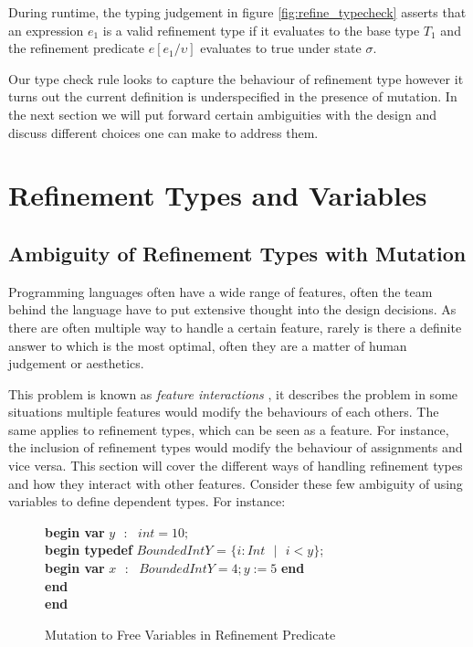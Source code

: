 \documentclass[a4paper,12pt]{report}
\newenvironment{tabs}[1]
 {\flushleft\TabPositions{#1}}
 {\endflushleft}
\begin{document}
\par
During runtime, the typing judgement in figure \ref{fig:refine_typecheck} 
asserts that an expression $e_1$ is a valid refinement type if it 
evaluates to the base type $T_1$ and the refinement predicate $e[e_1/\upsilon]$ 
evaluates to true under state $\sigma$.

\par
Our type check rule looks to capture the behaviour of refinement type however it 
turns out the current definition is underspecified in the presence of mutation. 
In the next section we will put forward certain ambiguities with the 
design and discuss different choices one can make to address them.

\section{Refinement Types and Variables}
\subsection{Ambiguity of Refinement Types with Mutation}
Programming languages often have a wide range of features, often the team behind 
the language have to put extensive thought into the design decisions. As there 
are often multiple way to handle a certain feature, rarely is there a definite 
answer to which is the most optimal, often they are a matter of human judgement 
or aesthetics. 

\par
This problem is known as \textit{feature interactions} 
\cite{featInteract}, it describes the problem in some situations multiple 
features would modify the behaviours of each others. The same applies to 
refinement types, which can be seen as a feature. For instance, the inclusion 
of refinement types would modify the behaviour of assignments and vice versa. 
This section will cover the different ways of handling refinement types and how 
they interact with other features.
Consider these few ambiguity of using variables to define dependent types. For 
instance: 

\begin{figure} [H]
  \begin{tabs}{1cm,2cm}
    \textbf{begin var }$y\text{ }:\text{ } int = 10;$ \\
    \tab\textbf{begin typedef }$BoundedIntY$ = $\{i : Int\text{ }|\text{ } i < y\}$; \\ 
    \tab\tab\textbf{begin var }$x\text{ }:\text{ }BoundedIntY = 4;y := 5$\textbf { end} \\
    \tab\textbf {end} \\
    \textbf{end}
  \end{tabs}  
  \caption{Mutation to Free Variables in Refinement Predicate}
  \label{fig:amb_refinement_vars}
\end{figure}
\end{document}
